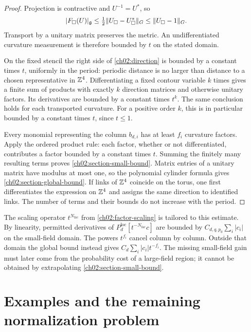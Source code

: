 \begin{proof}
Projection is contractive and $U^{-1}=U^*$, so
\[
 |F_\square(U)|_{\mathfrak g}
 \le\tfrac12\|U_\square-U_\square^*\|_G
 \le\|U_\square-1\|_G .
\]
Transport by a unitary matrix preserves the metric. An undifferentiated
curvature measurement is therefore bounded by $t$ on the stated domain.

On the fixed stencil the right side of \eqref{ch02:direction} is bounded
by a constant times $t$, uniformly in the period: periodic distance is
no larger than distance to a chosen representative in $\mathbb Z^4$.
Differentiating a fixed contour variable $k$ times gives a finite sum of
products with exactly $k$ direction matrices and otherwise unitary
factors. Its derivatives are bounded by a constant times $t^k$.
The same conclusion holds for each transported curvature. For a positive
order $k$, this is in particular bounded by a constant times $t$, since
$t\le1$.

Every monomial representing the column $b_{d,i}$ has at least $f_i$
curvature factors. Apply the ordered product rule: each factor, whether
or not differentiated, contributes a factor bounded by a constant times
$t$. Summing the finitely many resulting terms proves
\eqref{ch02:section-small-bound}. Matrix entries of a unitary matrix have
modulus at most one, so the polynomial cylinder formula gives
\eqref{ch02:section-global-bound}.
If links of $\mathbb Z^4$ coincide on the torus, one first differentiates the
expression on $\mathbb Z^4$ and assigns the same direction to identified links.
The number of terms and their bounds do not increase with the period.
\end{proof}

The scaling operator $t^{N_{\mathrm{fac}}}$ from
\eqref{ch02:factor-scaling} is tailored to this estimate. By linearity,
permitted derivatives of $P_d^{\mathrm{loc}}[t^{-N_{\mathrm{fac}}}c]$
are bounded by $C_{d,q,p_0}\sum_i|c_i|$ on the small-field domain. The
powers $t^{f_i}$ cancel column by column. Outside that domain the global
bound instead gives $C_d\sum_i|c_i|t^{-f_i}$. The missing small-field gain
must later come from the probability cost of a large-field region;
it cannot be obtained by extrapolating \eqref{ch02:section-small-bound}.



\section{Examples and the remaining normalization problem}
\label{ch02:normalization}


